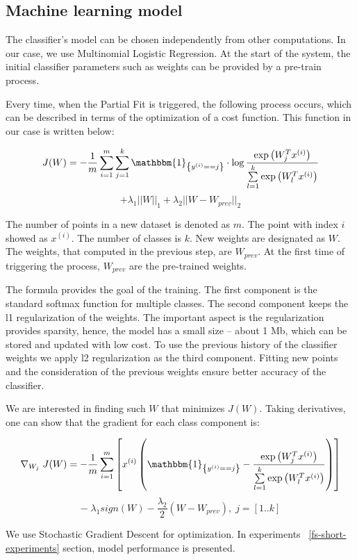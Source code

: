 \subsection{Machine learning model \label{ML}}

The classifier's model can be chosen independently from other computations. In our case, we use Multinomial Logistic Regression. At the start of the system, the initial classifier parameters such as weights can be provided by a pre-train process.

Every time, when the Partial Fit is triggered, the following process occurs, which can be described in terms of the optimization of a cost function. This function in our case is written below:

\begin{center}

$$ J(W) = -\frac{1}{m} \sum \limits_{i = 1}^{m} \sum \limits_{j = 1}^{k} \mathbbm{1}_{\left\{y^{(i)} == j\right\}} \cdot \log \frac{\exp\left({W_{j}^Tx^{(i)}}\right) }{\sum \limits_{l = 1}^{k}  \exp\left({W_{l}^Tx^{(i)}}\right) }$$ 
 $$ +  \lambda_1 ||W||_1 + \lambda_2 ||W - W_{prev}||_2 $$

\end{center} 

The number of points in a new dataset is denoted as $m$. The point with index $i$ showed as $x^{(i)}$. The number of classes is $k$. New weights are designated as $W$. The weights, that computed in the previous step, are $W_{prev}$. At the first time of triggering the process, $W_{prev}$ are the pre-trained weights. 

The formula provides the goal of the training. The first component is the standard softmax function for multiple classes. The second component keeps the l1 regularization of the weights. The important aspect is the regularization provides sparsity, hence, the model has a small size -- about 1 Mb, which can be stored and updated with low cost. To use the previous history of the classifier weights we apply l2 regularization as the third component. Fitting new points and the consideration of the previous weights ensure better accuracy of the classifier.

We are interested in finding such $W$ that minimizes $J(W)$. Taking derivatives, one can show that the gradient for each class component is:

\begin{center}

$$ \nabla_{W_j} \; J(W) = -\frac{1}{m} \sum \limits_{i = 1}^{m} \left[ x^{(i)} \left( \mathbbm{1}_{\left\{y^{(i)} == j\right\} } - \frac{\exp\left({W_{j}^Tx^{(i)}}\right)}{\sum \limits_{l = 1}^{k}  \exp\left({W_{l}^Tx^{(i)}}\right)} \right) \right] $$
$$ - \; \lambda_1 sign\left(W\right) - \frac{\lambda_2}{2} \left(W - W_{prev} \right), \; j = [1..k] $$

\end{center} 

We use Stochastic Gradient Descent for optimization. In experiments ~\ref{fs-short-experiments} section, model performance is presented.